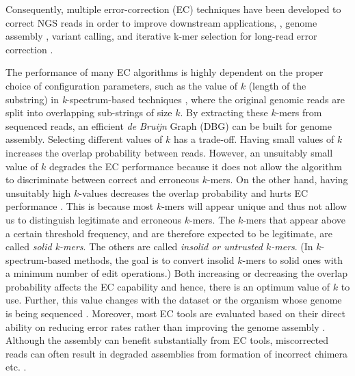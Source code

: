 Consequently, multiple error-correction (EC) techniques have been developed to correct NGS reads in order to improve downstream applications, \eg, genome assembly \cite{mahadik2017scalable}, variant calling, and iterative k-mer selection for long-read error correction \cite{szalay2015novo, sameith2016iterative}. 

The performance of many EC algorithms is highly dependent on the proper choice of configuration parameters, such as the value of $k$ (length of the substring) in \textit{k}-spectrum-based techniques \cite{mahadik2017scalable}, where the original genomic reads are split into overlapping sub-strings of size $k$. By extracting these $k$-mers from sequenced reads, an efficient \textit{de Bruijn} Graph (DBG) \cite{compeau2011apply} can be built for genome assembly. Selecting different values of $k$ has a trade-off. Having small values of $k$ increases the overlap probability between reads. However, an unsuitably small value of $k$ degrades the EC performance because it does not allow the algorithm to discriminate between correct and erroneous $k$-mers. On the other hand, having unsuitably high $k$-values decreases the overlap probability and hurts EC performance \cite{sameith2016iterative}. This is because most $k$-mers will appear unique and thus not allow us to distinguish legitimate and erroneous $k$-mers. 
The $k$-mers that appear above a certain threshold frequency, and are therefore expected to be legitimate, are called \textit{solid k-mers}. The others are called \textit{insolid or untrusted $k$-mers}. (In $k$-spectrum-based methods, the goal is to convert insolid $k$-mers to solid ones with a minimum number of edit operations.) Both increasing or decreasing the overlap probability affects the EC capability and hence, there is an optimum value of $k$ to use. Further, this value changes with the dataset or the organism whose genome is being sequenced \cite{heydari2017evaluation}. Moreover, most EC tools are evaluated based on their direct ability on reducing error rates rather than improving the genome assembly \cite{heydari2017evaluation}. Although the assembly can benefit substantially from EC tools, miscorrected reads can often result in degraded assemblies from formation of incorrect chimera etc. \cite{heydari2017evaluation}.
